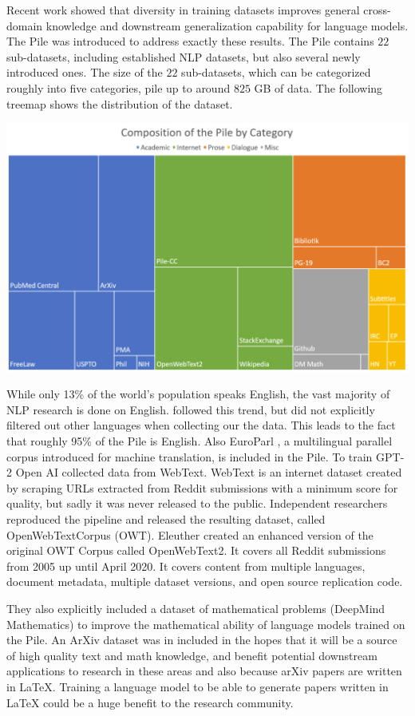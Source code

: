\documentclass[
]{krantz}
\begin{document}
Recent work \citep{rosset2020turing} showed that diversity in training datasets improves general cross-domain knowledge and downstream generalization capability for language models. The Pile \citep{gao2020pile} was introduced to address exactly these results. The Pile contains \(22\) sub-datasets, including established NLP datasets, but also several newly introduced ones. The size of the \(22\) sub-datasets, which can be categorized roughly into five categories, pile up to around \(825\) GB of data.
The following treemap shows the distribution of the dataset.

\includegraphics{figures/01-chapter1/thePile.png}

While only 13\% of the world's population speaks English, the vast majority of NLP research is done on English. \citet{gao2020pile} followed this trend, but did not explicitly filtered out other languages when collecting our the data. This leads to the fact that roughly 95\% of the Pile is English. Also EuroParl \citep{koehn2005europarl}, a multilingual parallel corpus introduced for machine translation, is included in the Pile. To train GPT-2 Open AI collected data from WebText. WebText is an internet dataset created by scraping URLs extracted from Reddit submissions with a minimum score for quality, but sadly it was never released to the public. Independent researchers reproduced the pipeline and released the resulting dataset, called OpenWebTextCorpus \citep{Gokaslan2019OpenWeb} (OWT). Eleuther created an enhanced version of the original OWT Corpus called OpenWebText2. It covers all Reddit submissions from 2005 up until April 2020. It covers content from multiple languages, document metadata, multiple dataset versions, and open source replication code.

They also explicitly included a dataset of mathematical problems (DeepMind Mathematics) to improve the mathematical ability of language models trained on the Pile. An ArXiv dataset was in included in the hopes that it will be a source of high quality text and math knowledge, and benefit potential downstream applications to research in these areas and also because arXiv papers are written in LaTeX. Training a language model to be able to generate papers written in LaTeX could be a huge benefit to the research community.
\end{document}

